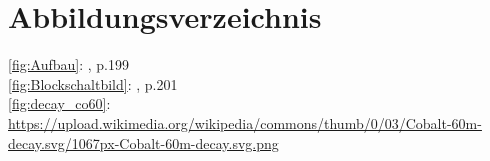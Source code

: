 \newpage
{}
\renewcommand{\refname}{Quellen}   
\renewcommand{\bibname}{Quellen} %



\nocite{Vorbereitungshilfe}
\nocite{Ordner}
\section*{Abbildungsverzeichnis}
\autoref{fig:Aufbau}:  \cite{Vorbereitungshilfe}, p.199\\
\autoref{fig:Blockschaltbild}:  \cite{Vorbereitungshilfe}, p.201\\
\autoref{fig:decay_co60}:  \url{https://upload.wikimedia.org/wikipedia/commons/thumb/0/03/Cobalt-60m-decay.svg/1067px-Cobalt-60m-decay.svg.png}


